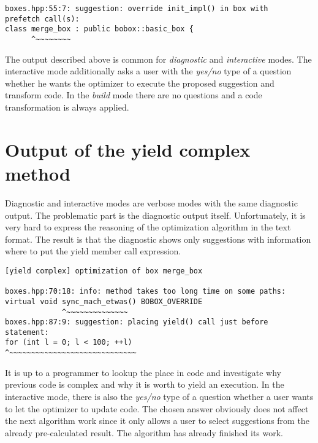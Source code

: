 \documentclass[12pt,a4paper]{report}
\let\openright=\clearpage
\begin{document}
\begin{lstlisting}[emph={merge\_box,boxes,hpp},emphstyle={\textbf}]
boxes.hpp:55:7: suggestion: override init_impl() in box with
prefetch call(s):
class merge_box : public bobox::basic_box {
      ^~~~~~~~~
\end{lstlisting}

The output described above is common for \emph{diagnostic} and \emph{interactive} modes. The interactive mode additionally asks a user with the \emph{yes/no} type of a question whether he wants the optimizer to execute the proposed suggestion and transform code. In the \emph{build} mode there are no questions and a code transformation is always applied.

\section{Output of the yield complex method}
\label{output-yield}
Diagnostic and interactive modes are verbose modes with the same diagnostic output. The problematic part is the diagnostic output itself. Unfortunately, it is very hard to express the reasoning of the optimization algorithm in the text format. The result is that the diagnostic shows only suggestions with information where to put the yield member call expression.

\begin{lstlisting}[emph={yield,complex,merge\_box,sync\_mach\_etwas,boxes,hpp},emphstyle={\textbf}]
[yield complex] optimization of box merge_box

boxes.hpp:70:18: info: method takes too long time on some paths:
virtual void sync_mach_etwas() BOBOX_OVERRIDE
             ^~~~~~~~~~~~~~~
boxes.hpp:87:9: suggestion: placing yield() call just before
statement:
for (int l = 0; l < 100; ++l)
^~~~~~~~~~~~~~~~~~~~~~~~~~~~~~
\end{lstlisting}

It is up to a programmer to lookup the place in code and investigate why previous code is complex and why it is worth to yield an execution. In the interactive mode, there is also the \emph{yes/no} type of a question whether a user wants to let the optimizer to update code. The chosen answer obviously does not affect the next algorithm work since it only allows a user to select suggestions from the already pre-calculated result. The algorithm has already finished its work.

\openright
\end{document}

